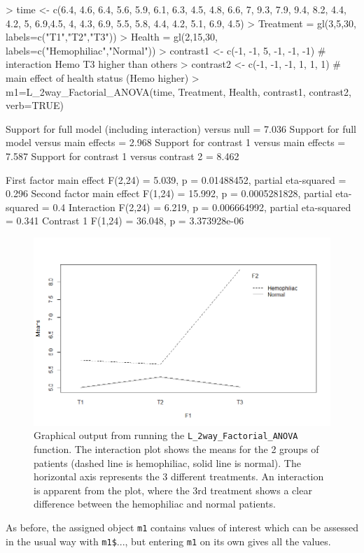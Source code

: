 \begin{example}
> time <- c(6.4, 4.6, 6.4, 5.6, 5.9, 6.1, 6.3, 4.5, 4.8, 6.6, 7, 9.3, 7.9, 9.4, 8.2,
          4.4, 4.2, 5, 6.9,4.5, 4, 4.3, 6.9, 5.5, 5.8, 4.4, 4.2, 5.1, 6.9, 4.5)
> Treatment = gl(3,5,30, labels=c("T1","T2","T3"))
> Health = gl(2,15,30, labels=c("Hemophiliac","Normal"))
> contrast1 <- c(-1, -1, 5, -1, -1, -1) # interaction Hemo T3 higher than others
> contrast2 <- c(-1, -1, -1, 1, 1, 1)    # main effect of health status (Hemo higher)
> m1=L_2way_Factorial_ANOVA(time, Treatment, Health, contrast1, contrast2, verb=TRUE)

Support for full model (including interaction) versus null = 7.036
 Support for full model versus main effects = 2.968
 Support for contrast 1 versus main effects = 7.587
 Support for contrast 1 versus contrast 2 = 8.462

First factor main effect F(2,24) = 5.039, p = 0.01488452, partial eta-squared = 0.296
 Second factor main effect F(1,24) = 15.992, p = 0.0005281828, partial eta-squared = 0.4
 Interaction F(2,24) = 6.219, p = 0.006664992, partial eta-squared = 0.341
 Contrast 1 F(1,24) = 36.048, p = 3.373928e-06
\end{example}
\begin{figure}[htbp]
\centering
\includegraphics[width=12cm,
  keepaspectratio,]{figure2}
\caption{Graphical output from running the \texttt{L\_2way\_Factorial\_ANOVA} function. The interaction plot shows the means for the 2 groups of patients (dashed line is hemophiliac, solid line is normal). The horizontal axis represents the 3 different treatments. An interaction is apparent from the plot, where the 3rd treatment shows a clear difference between the hemophiliac and normal patients.}
\label{figure:figure2}
\end{figure}
As before, the assigned object \texttt{m1} contains values of interest which can be assessed in the usual way with \texttt{m1\$}..., but entering \texttt{m1} on its own gives all the values.\\
